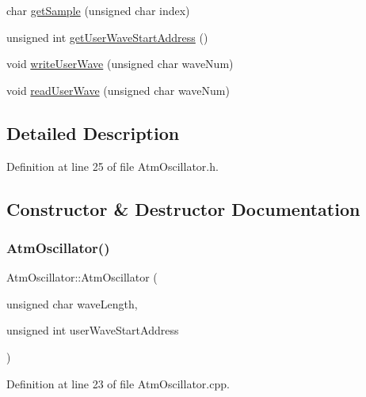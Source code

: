 \begin{DoxyCompactItemize}
\item 
char \hyperlink{class_atm_oscillator_aa6fe7de8b2d573159271a47f5c8686e1}{get\+Sample} (unsigned char index)
\item 
unsigned int \hyperlink{class_atm_oscillator_a19bdaa400d57eeb24ca027febc2fd1cf}{get\+User\+Wave\+Start\+Address} ()
\item 
void \hyperlink{class_atm_oscillator_a92133ff9c3b34a6acb703f0d6d95cd71}{write\+User\+Wave} (unsigned char wave\+Num)
\item 
void \hyperlink{class_atm_oscillator_a08b383cd2305c232de827399aa8d2ccb}{read\+User\+Wave} (unsigned char wave\+Num)
\end{DoxyCompactItemize}


\subsection{Detailed Description}


Definition at line 25 of file Atm\+Oscillator.\+h.



\subsection{Constructor \& Destructor Documentation}
\mbox{\label{class_atm_oscillator_a864b35c83864a6d5045f9dbb42fa862e}} 
\subsubsection{\texorpdfstring{Atm\+Oscillator()}{AtmOscillator()}}
{\footnotesize\ttfamily Atm\+Oscillator\+::\+Atm\+Oscillator (\begin{DoxyParamCaption}\item[{unsigned char}]{wave\+Length,  }\item[{unsigned int}]{user\+Wave\+Start\+Address }\end{DoxyParamCaption})}



Definition at line 23 of file Atm\+Oscillator.\+cpp.

